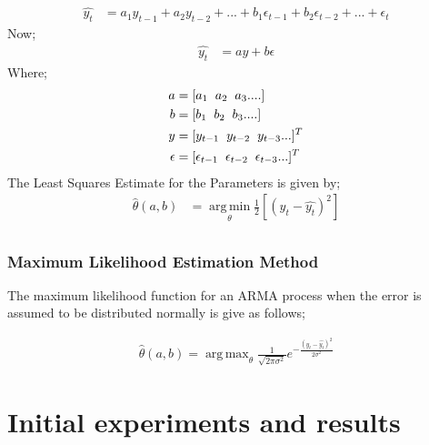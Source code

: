 \documentclass[journal]{IEEEtran}
\DeclareMathOperator*{\argmax}{arg\,max} %
\begin{document}
\begin{align*}
\widehat{y_{t}} &= a_{1}y_{t-1} + a_{2}y_{t-2} + ... + b_{1}\epsilon_{t-1} + b_{2}\epsilon_{t-2}+ ... + \epsilon_{t}
\end{align*}
Now;
\begin{align*}
\widehat{y_{t}} &= ay + b\epsilon
\end{align*}
Where;
\begin{align*}
a &= [a_{1} \hspace{2mm} a_{2} \hspace{2mm} a_{3} .... ]\\
b &= [b_{1} \hspace{2mm} b_{2} \hspace{2mm} b_{3} .... ]\\
y &= [y_{t-1} \hspace{2mm} y_{t-2} \hspace{2mm} y_{t-3} ...]^{T}\\
\epsilon &= [\epsilon_{t-1} \hspace{2mm} \epsilon_{t-2} \hspace{2mm} \epsilon_{t-3} ...]^{T}
\end{align*}
The Least Squares Estimate for the Parameters is given by;
\begin{align*}
\widehat{\theta}(a,b) &= \operatorname*{arg\,min}_\theta \frac{1}{2} \left[ \left(y_{t}-\widehat{y_{t}} \right)^{2} \right]\\
\end{align*}

\subsubsection{Maximum Likelihood Estimation Method}

The maximum likelihood function for an ARMA process when the error is assumed to be distributed normally is give as follows;

\begin{align*}
\widehat{\theta}(a,b)= \argmax_\theta \frac{1}{\sqrt{2\pi\sigma^{2}}} e^{-\frac{\left(y_{t}-\widehat{y_{t}} \right)^{2}}{2\sigma^{2}}}
\end{align*}


\section{Initial experiments and results}
\end{document}
